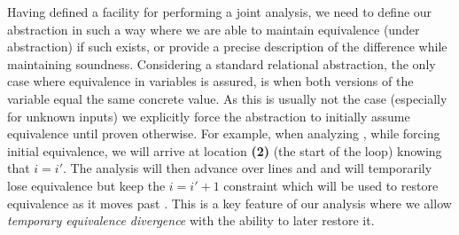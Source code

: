 Having defined a facility for performing a joint analysis, we need to define our abstraction in such a way where we
are able to maintain equivalence (under abstraction) if such exists, or provide a precise description of the difference while maintaining soundness. Considering a standard relational abstraction, the only case where equivalence in variables is assured, is when both versions of the variable equal the same concrete value. As this is usually not the case (especially for unknown inputs) we explicitly force the abstraction to initially assume equivalence until proven otherwise. For example, when analyzing , while forcing initial equivalence, we will arrive at location \textbf{(2)} (the start of the loop) knowing that ${i = i'}$. The analysis will then advance over lines  and  and will temporarily lose equivalence but keep the ${i = i' + 1}$ constraint which will be used to restore equivalence as it moves past . This is a key feature of our analysis where we allow \emph{temporary equivalence divergence} with the ability to later restore it.

